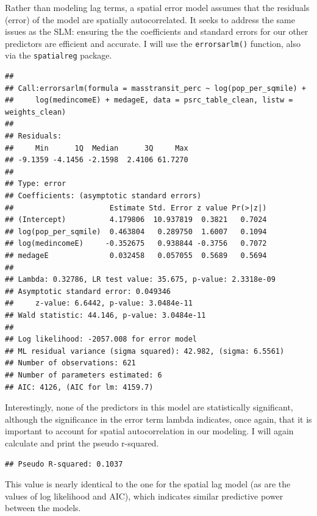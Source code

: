 \documentclass[
]{article}
\begin{document}
Rather than modeling lag terms, a spatial error model assumes that the
residuals (error) of the model are spatially autocorrelated. It seeks to
address the same issues as the SLM: ensuring the the coefficients and
standard errors for our other predictors are efficient and accurate. I
will use the \texttt{errorsarlm()} function, also via the
\texttt{spatialreg} package.

\begin{verbatim}
## 
## Call:errorsarlm(formula = masstransit_perc ~ log(pop_per_sqmile) + 
##     log(medincomeE) + medageE, data = psrc_table_clean, listw = weights_clean)
## 
## Residuals:
##     Min      1Q  Median      3Q     Max 
## -9.1359 -4.1456 -2.1598  2.4106 61.7270 
## 
## Type: error 
## Coefficients: (asymptotic standard errors) 
##                      Estimate Std. Error z value Pr(>|z|)
## (Intercept)          4.179806  10.937819  0.3821   0.7024
## log(pop_per_sqmile)  0.463804   0.289750  1.6007   0.1094
## log(medincomeE)     -0.352675   0.938844 -0.3756   0.7072
## medageE              0.032458   0.057055  0.5689   0.5694
## 
## Lambda: 0.32786, LR test value: 35.675, p-value: 2.3318e-09
## Asymptotic standard error: 0.049346
##     z-value: 6.6442, p-value: 3.0484e-11
## Wald statistic: 44.146, p-value: 3.0484e-11
## 
## Log likelihood: -2057.008 for error model
## ML residual variance (sigma squared): 42.982, (sigma: 6.5561)
## Number of observations: 621 
## Number of parameters estimated: 6 
## AIC: 4126, (AIC for lm: 4159.7)
\end{verbatim}

Interestingly, none of the predictors in this model are statistically
significant, although the significance in the error term lambda
indicates, once again, that it is important to account for spatial
autocorrelation in our modeling. I will again calculate and print the
pseudo r-squared.

\begin{verbatim}
## Pseudo R-squared: 0.1037
\end{verbatim}

This value is nearly identical to the one for the spatial lag model (as
are the values of log likelihood and AIC), which indicates similar
predictive power between the models.
\end{document}
